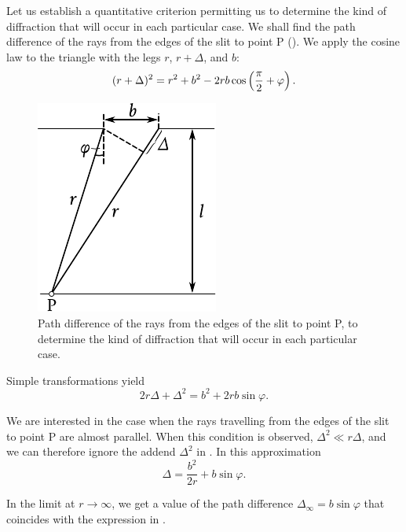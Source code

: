Let us establish a quantitative criterion permitting us to determine the kind of diffraction that will occur in each particular case.
We shall find the path difference of the rays from the edges of the slit to point P ().
We apply the cosine law to the triangle with the legs $r$, $r+\Delta$, and $b$:
\begin{equation*}
	(r+\Delta)^2 = r^2 + b^2 - 2rb \cos\left(\frac{\pi}{2} + \varphi\right).
\end{equation*}

\begin{figure}[t]
	\begin{center}
		\includegraphics[scale=1]{figures/ch_18/fig_18_30.pdf}
        \caption[]{Path difference of the rays from the edges of the slit to point P, to determine the kind of diffraction that will occur in each particular case.}
		\label{fig:18_30}
	\end{center}
	\vspace{-0.8cm}
\end{figure}

Simple transformations yield
\begin{equation}\label{eq:18_31}
	2r\Delta + \Delta^2 = b^2 + 2rb \sin\varphi.
\end{equation}

\noindent
We are interested in the case when the rays travelling from the edges of the slit to point P are almost parallel.
When this condition is observed, $\Delta^2\ll r\Delta$, and we can therefore ignore the addend $\Delta^2$ in .
In this approximation
\begin{equation}\label{eq:18_32}
	\Delta = \frac{b^2}{2r} + b \sin\varphi.
\end{equation}

\noindent
In the limit at $r\to\infty$, we get a value of the path difference $\Delta_{\infty}=b \sin\varphi$ that coincides with the expression in .

